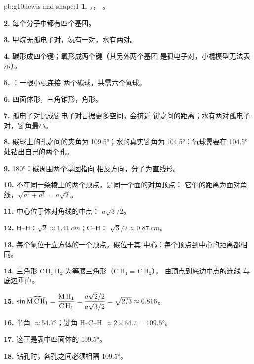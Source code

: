 \begin{solution}{pb:g10:lewis-and-shape:1}
\textbf{1.} ，，
。

\textbf{2.} 每个分子中都有四个基团。

\textbf{3.} 甲烷无孤电子对，氨有一对，水有两对。

\textbf{4.} 碳形成四个键；氧形成两个键（其另外两个基团
是孤电子对，小棍模型无法表示）。

\textbf{5.} ：一根小棍连接
两个碳球，共需六个氢球。

\textbf{6.} 四面体形，三角锥形，角形。

\textbf{7.} 孤电子对比成键电子对占据更多空间，会挤近
键之间的距离；水有两对孤电子对，键角最小。

\textbf{8.} 碳球上的孔之间的夹角为 \ang{109.5}；水的真实键角为
\ang{104.5}：氧球需要在 \ang{104.5} 处钻出自己的两个孔。

\textbf{9.} \ang{180}：碳周围两个基团指向
相反方向，分子为直线形。

\textbf{10.} 不在同一条棱上的两个顶点，是同一个面的对角顶点：
它们的距离为面对角线，$\sqrt{a^2 + a^2} = a\sqrt{2}$。

\textbf{11.} 中心位于体对角线的中点：
$a\sqrt{3}/2$。

\textbf{12.} H--H：$\sqrt{2} \approx \qty{1.41}{cm}$；C--H：
$\sqrt{3}/2 \approx \qty{0.87}{cm}$。

\textbf{13.} 每个氢位于立方体的一个顶点，碳位于其
中心：每个顶点到中心的距离都相同。

\textbf{14.} 三角形 C\,H$_1$\,H$_2$ 为等腰三角形（C\,H$_1$ = C\,H$_2$），
由顶点到底边中点的连线
与底边垂直。

\textbf{15.} $\sin \widehat{\text{M\,C\,H}_1} = \dfrac{\text{M\,H}_1}{\text{C\,H}_1}
= \dfrac{a\sqrt{2}/2}{a\sqrt{3}/2} = \sqrt{2/3} \approx 0.816$。

\textbf{16.} 半角 $\approx \ang{54.7}$；键角 H--C--H $\approx
2 \times 54.7 = \ang{109.5}$。

\textbf{17.} 这正是表中四面体的 \ang{109.5}。

\textbf{18.} 钻孔时，各孔之间必须相隔 \ang{109.5}。
\end{solution}
